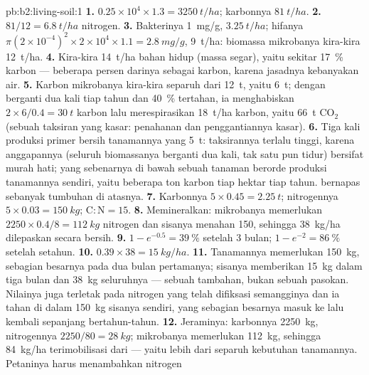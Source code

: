 \begin{solution}{pb:b2:living-soil:1}
\textbf{1.} $0.25\times 10^{4}\times 1.3 = \qty{3250}{t/ha}$;
karbonnya $\qty{81}{t/ha}$.
\textbf{2.} $81/12 = \qty{6.8}{t/ha}$ nitrogen.
\textbf{3.} Bakterinya \qty{1}{mg/g}, $\qty{3.25}{t/ha}$; hifanya
$\pi(2\times 10^{-4})^{2}\times 2\times 10^{4}\times 1.1 =
\qty{2.8}{mg/g}$, \qty{9}{t/ha}: biomassa mikrobanya kira-kira
\qty{12}{t/ha}.
\textbf{4.} Kira-kira \qty{14}{t/ha} bahan hidup (massa segar), yaitu
sekitar \qty{17}{\%} karbon  --- beberapa persen darinya
sebagai karbon, karena jasadnya kebanyakan air.
\textbf{5.} Karbon mikrobanya kira-kira separuh dari \qty{12}{t},
yaitu \qty{6}{t}; dengan berganti dua kali tiap tahun dan
\qty{40}{\%} tertahan, ia menghabiskan
$2\times 6/0.4 = \qty{30}{t}$ karbon lalu merespirasikan \qty{18}{t/ha}
karbon, yaitu \qty{66}{t} $\mathrm{CO_2}$ (sebuah taksiran yang kasar:
penahanan dan penggantiannya kasar).
\textbf{6.} Tiga kali produksi primer bersih tanamannya yang
\qty{5}{t}: taksirannya terlalu tinggi, karena anggapannya (seluruh
biomassanya berganti dua kali, tak satu pun tidur) bersifat murah hati;
 yang sebenarnya di bawah sebuah tanaman berorde
produksi tanamannya sendiri, yaitu beberapa ton karbon tiap hektar tiap
tahun.  bernapas sebanyak tumbuhan di atasnya.
\textbf{7.} Karbonnya $5\times 0.45 = \qty{2.25}{t}$; nitrogennya
$5\times
0.03 = \qty{150}{kg}$; $\mathrm{C:N} = 15$.
\textbf{8.} Memineralkan: mikrobanya memerlukan $2250\times 0.4/8 =
\qty{112}{kg}$ nitrogen dan sisanya menahan 150, sehingga
\qty{38}{kg/ha} dilepaskan secara bersih.
\textbf{9.} $1 - e^{-0.5} = \qty{39}{\%}$ setelah 3 bulan; $1 - e^{-2}
= \qty{86}{\%}$ setelah setahun.
\textbf{10.} $0.39\times 38 = \qty{15}{kg/ha}$.
\textbf{11.} Tanamannya memerlukan \qty{150}{kg}, sebagian besarnya
pada dua bulan pertamanya; sisanya memberikan \qty{15}{kg} dalam tiga
bulan dan \qty{38}{kg} seluruhnya --- sebuah tambahan, bukan sebuah
pasokan. Nilainya juga terletak pada nitrogen yang telah difiksasi
semangginya dan ia tahan di dalam \qty{150}{kg} sisanya sendiri, yang
sebagian besarnya masuk ke  lalu kembali sepanjang
bertahun-tahun.
\textbf{12.} Jeraminya: karbonnya \qty{2250}{kg}, nitrogennya $2250/80 =
\qty{28}{kg}$; mikrobanya memerlukan \qty{112}{kg}, sehingga
\qty{84}{kg/ha} terimobilisasi dari  --- yaitu lebih dari
separuh kebutuhan tanamannya. Petaninya harus menambahkan nitrogen

\end{solution}
